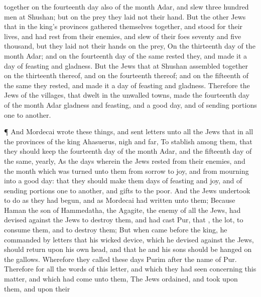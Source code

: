 {together on the
fourteenth
day also of the
month
Adar, and
slew
three
hundred
men at
Shushan; but on the
prey they
laid not their
hand.
But the
other
Jews that
{} in the
king’s
provinces gathered themselves
together, and
stood for their
lives, and had
rest from their
enemies, and
slew of their
foes
seventy and
five
thousand, but they
laid not their
hands on the
prey,
On the
thirteenth
day of the
month
Adar; and on the
fourteenth day of the same
rested they, and
made it a
day of
feasting and
gladness.
But the
Jews that
{} at
Shushan assembled
together on the
thirteenth
{} thereof, and on the
fourteenth thereof; and on the
fifteenth
{} of the same they
rested, and
made it a
day of
feasting and
gladness.
Therefore the
Jews of the
villages, that
dwelt in the
unwalled
towns,
made the
fourteenth
day of the
month
Adar
{}
gladness and
feasting, and a
good
day, and of
sending
portions
one to
another.
\par }{\PP {}¶ And
Mordecai
wrote these
things, and
sent
letters unto all the
Jews that
{} in all the
provinces of the
king
Ahasuerus,
{}
nigh and
far,
To
stablish
{} among them, that they should
keep the
fourteenth
day of the
month
Adar, and the
fifteenth
day of the same,
yearly,
As the
days wherein the
Jews
rested from their
enemies, and the
month which was
turned unto them from
sorrow to
joy, and from
mourning into a
good
day: that they should
make them
days of
feasting and
joy, and of
sending
portions
one to
another, and
gifts to the
poor.
And the
Jews
undertook to
do as they had
begun, and as
Mordecai had
written unto them;
Because
Haman the
son of
Hammedatha, the
Agagite, the
enemy of all the
Jews, had
devised against the
Jews to
destroy them, and had
cast
Pur, that
{}, the
lot, to
consume them, and to
destroy them;
But when
{}
came
before the
king, he
commanded by
letters that his
wicked
device, which he
devised against the
Jews, should
return upon his own
head, and that he and his
sons should be
hanged on the
gallows.
Wherefore they
called these
days
Purim after the
name of
Pur. Therefore for all the
words of this
letter, and
{} which they had
seen concerning this
matter, and which had
come unto them,
The
Jews
ordained, and
took upon them, and upon their
}
